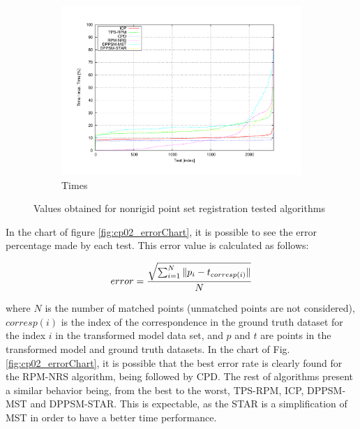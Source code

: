 \begin{figure}[t]
        \begin{subfigure}[b]{0.5\columnwidth}
                \centering
                \includegraphics[width=\textwidth, trim=50 45 80 50,clip]{fig20.pdf}
                \caption{Times}
                \label{fig:cp02_timesChart}
        \end{subfigure}%

        \caption{Values obtained for nonrigid point set registration tested algorithms}\label{fig:cp02_chartsRegistration}
\end{figure}

In the chart of figure \ref{fig:cp02_errorChart}, it is possible to see the error percentage made by each test. This 
error value is calculated as follows:

\begin{equation}\label{eq_errorCalculation}
error = { { \sqrt{ \sum_{i=1}^N \| p_i - t_{corresp(i)}\| } } \over N }
\end{equation}

where $N$ is the number of matched points (unmatched points are not considered), $corresp(i)$ is the index of the correspondence in the ground truth dataset for the index $i$ in the transformed model data set, and $p$ and $t$ are points in the transformed model and ground truth datasets.
In the chart of Fig. \ref{fig:cp02_errorChart}, it is possible that the best error rate is clearly found for the RPM-NRS 
algorithm, being followed by CPD.  The rest of algorithms present a similar behavior being, from the best to the 
worst, TPS-RPM, ICP, DPPSM-MST and DPPSM-STAR. This is expectable, as the STAR is a simplification of MST in order to 
have a better time performance.

